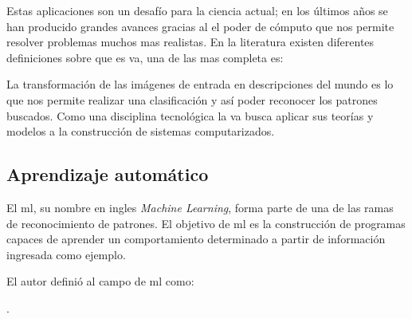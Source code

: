 Estas aplicaciones son un desafío para la ciencia actual; en los últimos años se han producido grandes avances gracias al el poder de cómputo que nos permite resolver problemas muchos mas realistas. En la literatura existen diferentes definiciones sobre que es \ac{va}, una de las mas completa es:
 \begin{center}
\begin{minipage}{0.8\linewidth}  
\begin{flushright}
 \citep{Reinhard}
\end{flushright}
\vspace{5pt}
\end{minipage}
\end{center}
 
La transformación de las imágenes de entrada en descripciones del mundo es lo que nos permite realizar una clasificación y así poder reconocer los patrones buscados. 
Como una disciplina tecnológica la \ac{va} busca aplicar sus teorías y modelos a la construcción de sistemas computarizados.
 
 
\subsection{Aprendizaje automático}\label{sub:introml}
El \ac{ml}, su nombre en ingles \textit{Machine Learning}, forma parte de una de las ramas de reconocimiento de patrones. El objetivo de \ac{ml} es la construcción de programas capaces de aprender un comportamiento determinado a partir de información ingresada como ejemplo.

El autor \citep{murphy} definió al campo de  \ac{ml} como:
\begin{center}
\begin{minipage}{0.8\linewidth}  \vspace{5pt}{\small Conjunto de métodos que pueden automáticamente detectar patrones en datos y entonces usar estos patrones para predecir el futuro o realizar alguna toma de decisiones bajo condiciones de incertidumbre}.
\begin{flushright}
 \citep{murphy}
\end{flushright}
\vspace{5pt}
\end{minipage}
\end{center}

